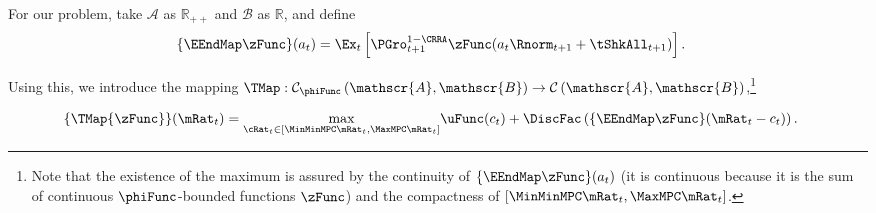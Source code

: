 \documentclass[./BufferStockTheory.tex]{subfiles}
\begin{document}
For our problem, take $\mathscr{A}$ as $\mathbb{R}_{++}$ and $\mathscr{B}$
as $\mathbb{R}$, and define
\begin{align*}
  \{\EEndMap \zFunc\}(a_{t})  & = \Ex_{t}\left[\PGro^{1-\CRRA}_{t+1} \zFunc(a_{t} \Rnorm_{t+1} + \tShkAll_{t+1})\right].
\end{align*}

Using this, we introduce the mapping \textit{$\TMap:\mathcal{C}_{\phiFunc }\left( \mathscr{A},\mathscr{B}\right) \rightarrow \mathcal{C}\left(
    \mathscr{A},\mathscr{B}\right) $},\footnote{Note that the existence of the maximum is assured by the continuity of $\{\EEndMap \zFunc\}(a_{t})$ (it is continuous because it is the sum of continuous $\phiFunc$-bounded functions $\zFunc$) and the compactness of $[\MinMinMPC \mRat_{t},  \MaxMPC \mRat_{t}]$.}
\begin{comment} %
(In the subtle case when $\MinMinMPC=0$, the compact interval could be revised as $ [(\MinMinMPC+\epsilon) \mRat_{t},
  \MaxMPC \mRat_{t}]$ where $\epsilon$ is a very small positive number because obviously $\MinMinMPC \mRat_{t}=0$ will not be the $\argmax$)
\end{comment}
\begin{equation}\begin{gathered}\begin{aligned}
\{\TMap{\zFunc}\}(\mRat_{t})  & = \underset{{\cRat}_{t} \in
[\MinMinMPC \mRat_{t}, \MaxMPC \mRat_{t}]
} \max
\uFunc(c_{t})+\DiscFac \left( \{\EEndMap \zFunc \}(\mRat_{t}-c_{t}) \right)  \label{definitionmappingT}.
%
\end{aligned}\end{gathered}\end{equation}


\begin{comment}
Unpacking the definitions, our mapping $\TMap$ can be written more explicitly as
\begin{equation}\begin{gathered}\begin{aligned}
\{\TMap\zFunc\}(\mRat_{t})  & = \underset{\cRat_{t} \in [\MinMinMPC
  \mRat_{t}, \MaxMPC \mRat_{t}]} \max \left\{
\uFunc(c_{t})+\DiscFac \Ex_{t}\left[ {\PGro}_{t+1} ^{1-\CRRA }\zFunc(
{\aRat}_{t}\Rnorm_{t+1}+\tShkAll_{t+1}) \right] \right\}
.
\end{aligned}\end{gathered}\end{equation}
\end{comment}

\hypertarget{Contraction-Conditions}{}
\end{document}
